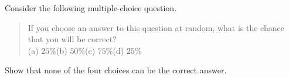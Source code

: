 Consider the following multiple-choice question.
\begin{quote}
If you choose an answer to this question at random, what is the chance that you will be correct?\\
(a) $25\%$\qquad (b) $50\%$\qquad (c) $75\%$\qquad (d) $25\%$
\end{quote}
Show that none of the four choices can be the correct answer.
